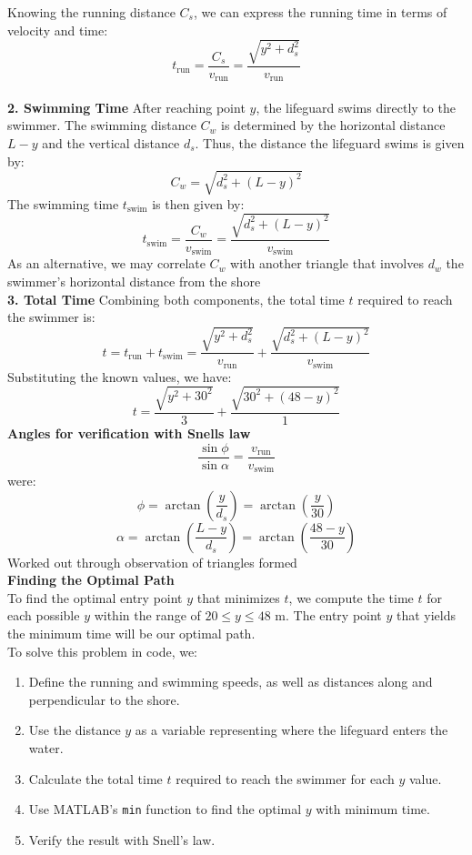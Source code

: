 \documentclass[a4paper, 12pt]{report}
\begin{document}
    Knowing the running distance \( C_s \), we can express the running time in terms of velocity and time:
    \[ t_{\text{run}} = \frac{C_s}{v_{\text{run}}} = \frac{\sqrt{y^2 + d_s^2}}{v_{\text{run}}} \]\\[8pt]
    \textbf{2. Swimming Time} After reaching point \( y \), the lifeguard swims directly to the swimmer. The swimming distance \( C_w \) is determined by the horizontal distance \( L - y \) and the vertical distance \( d_s \). Thus, the distance the lifeguard swims is given by:
    \[ C_w = \sqrt{d_s^2 + (L - y)^2} \]
    The swimming time \( t_{\text{swim}} \) is then given by:
    \[ t_{\text{swim}} = \frac{C_w}{v_{\text{swim}}} = \frac{\sqrt{d_s^2 + (L - y)^2}}{v_{\text{swim}}} \]
    As an alternative, we may correlate $C_w$ with another triangle that involves \( d_w \) the swimmer's horizontal distance from the shore\\[8pt]
    \textbf{3. Total Time} Combining both components, the total time \( t \) required to reach the swimmer is:
    \[ t = t_{\text{run}} + t_{\text{swim}} = \frac{\sqrt{y^2 + d_s^2}}{v_{\text{run}}} + \frac{\sqrt{d_s^2 + (L - y)^2}}{v_{\text{swim}}} \]
    Substituting the known values, we have:
    \[ t = \frac{\sqrt{y^2 + 30^2}}{3} + \frac{\sqrt{30^2 + (48 - y)^2}}{1} \]
    \textbf{Angles for verification with Snells law}
    \[\frac{\sin \phi}{\sin \alpha} = \frac{v_{\text{run}}}{v_{\text{swim}}}\]
    were:
    \[\phi = \arctan\left(\frac{y}{d_s}\right) = \arctan\left(\frac{y}{30}\right)\]
    \[\alpha = \arctan\left(\frac{L-y}{d_s}\right) = \arctan\left(\frac{48-y}{30}\right)\]
    Worked out through observation of triangles formed\\[1em]
    \textbf{Finding the Optimal Path}\\[8pt]
    To find the optimal entry point \( y \) that minimizes \( t \), we compute the time \( t \) for each possible \( y \) within the range of \( 20 \leq y \leq 48 \) m. The entry point \( y \) that yields the minimum time will be our optimal path.\\[1em]
    To solve this problem in code, we:
    \begin{enumerate}[itemsep=-0.1cm]
        \item Define the running and swimming speeds, as well as distances along and perpendicular to the shore.
        \item Use the distance \( y \) as a variable representing where the lifeguard enters the water.
        \item Calculate the total time \( t \) required to reach the swimmer for each \( y \) value.
        \item Use MATLAB’s \texttt{min} function to find the optimal \( y \) with minimum time.
        \item Verify the result with Snell's law.
    \end{enumerate}
    
\end{document}
